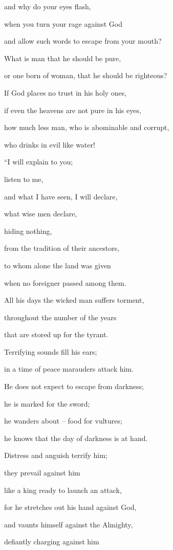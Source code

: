 {\par }{\Q and why
do your eyes
flash,
\par }{\Q {}when
you turn
your rage against God
\par }{\Q and allow
such words
to escape from
your mouth?
\par }{\Q {}What
is man
that
he should be pure,
\par }{\Q or one born
of woman,
that
he should be righteous?
\par }{\Q {}If
God places no
trust
in his holy ones,
\par }{\Q if even the heavens
are not
pure
in his eyes,
\par }{\Q {}how much less
man,
who is abominable
and corrupt,
\par }{\Q who drinks
in evil
like water!
\par }{\Q {}“I will explain
to you;
\par }{\Q listen
to me,
\par }{\Q and what I have
seen,
I will declare,
\par }{\Q {}what
wise
men declare,
\par }{\Q hiding nothing,
\par }{\Q from the tradition of their ancestors,
\par }{\Q {}to whom alone
the land
was given
\par }{\Q when no
foreigner
passed
among them.
\par }{\Q {}All
his days
the wicked
man suffers torment,
\par }{\Q throughout the number
of the years
\par }{\Q that are stored
up for the tyrant.
\par }{\Q {}Terrifying
sounds
fill his ears;
\par }{\Q in a time of peace
marauders
attack him.
\par }{\Q {}He does not
expect
to escape
from
darkness;
\par }{\Q he is marked
for the sword;
\par }{\Q {}he wanders about – food for vultures;
\par }{\Q he knows that the day of darkness is at hand.
\par }{\Q {}Distress
and anguish
terrify
him;
\par }{\Q they prevail against
him
\par }{\Q like a king
ready
to launch an attack,
\par }{\Q {}for
he stretches
out his hand
against God,
\par }{\Q and vaunts
himself against the Almighty,
\par }{\Q {}defiantly charging
against him

}
